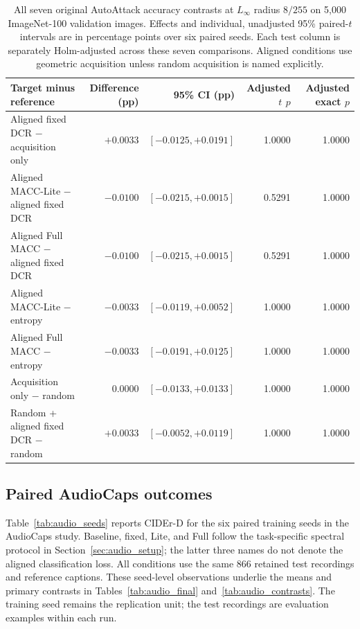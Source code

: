 \documentclass[10pt,a4paper,twocolumn]{article}
\begin{document}
\begin{table}[tbp]
\caption{All seven original AutoAttack accuracy contrasts at
$L_\infty$ radius $8/255$ on 5,000 ImageNet-100 validation images.
Effects and individual, unadjusted 95\% paired-$t$ intervals are in
percentage points over six paired seeds. Each test column is separately
Holm-adjusted across these seven comparisons. Aligned conditions use
geometric acquisition unless random acquisition is named explicitly.}
\label{tab:robustness_contrasts}
\centering\small
\begin{tabularx}{\textwidth}{@{}Yrrrr@{}}
\toprule
Target minus reference & Difference (pp) & 95\% CI (pp) &
Adjusted $t$ $p$ & Adjusted exact $p$ \\
\midrule
Aligned fixed DCR $-$ acquisition only & $+0.0033$ & $[-0.0125,+0.0191]$ & 1.0000 & 1.0000 \\
Aligned MACC-Lite $-$ aligned fixed DCR & $-0.0100$ & $[-0.0215,+0.0015]$ & 0.5291 & 1.0000 \\
Aligned Full MACC $-$ aligned fixed DCR & $-0.0100$ & $[-0.0215,+0.0015]$ & 0.5291 & 1.0000 \\
Aligned MACC-Lite $-$ entropy & $-0.0033$ & $[-0.0119,+0.0052]$ & 1.0000 & 1.0000 \\
Aligned Full MACC $-$ entropy & $-0.0033$ & $[-0.0191,+0.0125]$ & 1.0000 & 1.0000 \\
Acquisition only $-$ random & $0.0000$ & $[-0.0133,+0.0133]$ & 1.0000 & 1.0000 \\
Random + aligned fixed DCR $-$ random & $+0.0033$ & $[-0.0052,+0.0119]$ & 1.0000 & 1.0000 \\
\bottomrule
\end{tabularx}
\end{table}

\subsection{Paired AudioCaps outcomes}
\label{app:audio_seeds}

Table~\ref{tab:audio_seeds} reports CIDEr-D for the six paired training
seeds in the AudioCaps study. Baseline, fixed, Lite, and Full follow
the task-specific spectral protocol in Section~\ref{sec:audio_setup};
the latter three names do not denote the aligned classification loss.
All conditions use the same 866 retained test recordings and reference
captions. These seed-level observations underlie the means and primary
contrasts in Tables~\ref{tab:audio_final} and~\ref{tab:audio_contrasts}.
The training seed remains the replication unit; the test recordings
are evaluation examples within each run.
\end{document}
